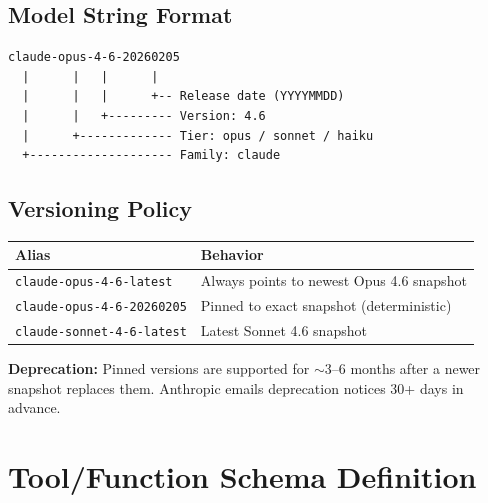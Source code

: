 \documentclass[11pt,a4paper]{article}
\begin{document}
\subsection{Model String Format}

\begin{lstlisting}[basicstyle=\ttfamily\small]
claude-opus-4-6-20260205
  |      |   |      |
  |      |   |      +-- Release date (YYYYMMDD)
  |      |   +--------- Version: 4.6
  |      +------------- Tier: opus / sonnet / haiku
  +-------------------- Family: claude
\end{lstlisting}

\subsection{Versioning Policy}

\begin{center}
\begin{tabular}{lL{9cm}}
\toprule
\textbf{Alias} & \textbf{Behavior} \\
\midrule
\texttt{claude-opus-4-6-latest} & Always points to newest Opus 4.6 snapshot \\
\texttt{claude-opus-4-6-20260205} & Pinned to exact snapshot (deterministic) \\
\texttt{claude-sonnet-4-6-latest} & Latest Sonnet 4.6 snapshot \\
\bottomrule
\end{tabular}
\end{center}

\textbf{Deprecation:} Pinned versions are supported for $\sim$3--6 months after a newer snapshot replaces them. Anthropic emails deprecation notices 30+ days in advance.

\section{Tool/Function Schema Definition}
\end{document}
